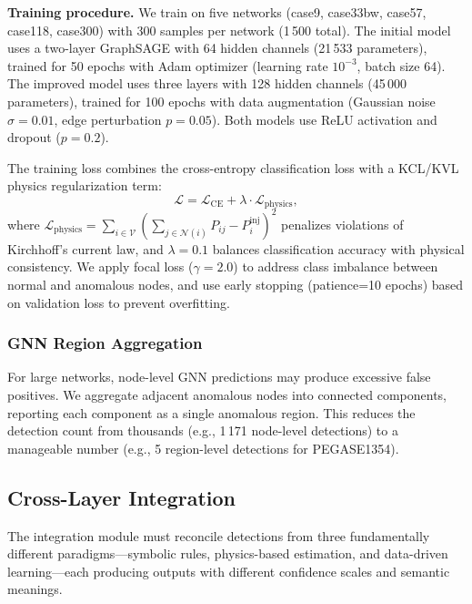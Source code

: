 \documentclass[research]{fcs}
\begin{document}
\textbf{Training procedure.} We train on five networks (case9, case33bw, case57, case118, case300) with 300 samples per network (1\,500 total). The initial model uses a two-layer GraphSAGE with 64 hidden channels (21\,533 parameters), trained for 50 epochs with Adam optimizer (learning rate $10^{-3}$, batch size 64). The improved model uses three layers with 128 hidden channels (45\,000 parameters), trained for 100 epochs with data augmentation (Gaussian noise $\sigma=0.01$, edge perturbation $p=0.05$). Both models use ReLU activation and dropout ($p=0.2$).

The training loss combines the cross-entropy classification loss with a KCL/KVL physics regularization term:
\begin{equation}
\mathcal{L} = \mathcal{L}_{\text{CE}} + \lambda \cdot \mathcal{L}_{\text{physics}},
\end{equation}
where $\mathcal{L}_{\text{physics}} = \sum_{i \in \mathcal{V}} (\sum_{j \in \mathcal{N}(i)} P_{ij} - P_i^{\text{inj}})^2$ penalizes violations of Kirchhoff's current law, and $\lambda = 0.1$ balances classification accuracy with physical consistency. We apply focal loss ($\gamma=2.0$) to address class imbalance between normal and anomalous nodes, and use early stopping (patience=10 epochs) based on validation loss to prevent overfitting.

\subsubsection{GNN Region Aggregation}

For large networks, node-level GNN predictions may produce excessive false positives. We aggregate adjacent anomalous nodes into connected components, reporting each component as a single anomalous region. This reduces the detection count from thousands (e.g., 1\,171 node-level detections) to a manageable number (e.g., 5 region-level detections for PEGASE1354).

\subsection{Cross-Layer Integration}

The integration module must reconcile detections from three fundamentally different paradigms---symbolic rules, physics-based estimation, and data-driven learning---each producing outputs with different confidence scales and semantic meanings.
\end{document}
